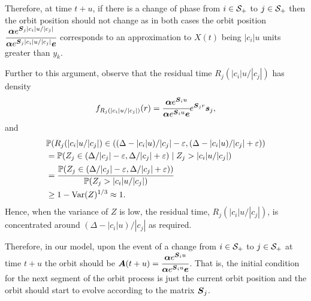 Therefore, at time \(t+u\), if there is a change of phase from \(i\in\mathcal{S}_+\) to \(j\in\mathcal{S}_+\) then the orbit position should not change as in both cases the orbit position \(\cfrac{\boldsymbol \alpha e^{\boldsymbol S_j |c_i|u/|c_j| } }{\boldsymbol \alpha e^{\boldsymbol S_j |c_i|u/|c_j|} \boldsymbol e }\) corresponds to an approximation to \(X(t)\) being \(|c_i|u\) units greater than \(y_k\). 


Further to this argument, observe that the residual time \(R_j(|c_i|u/|c_j|)\) has density 
\[f_{R_j(|c_i|u/|c_j|)}(r) = \cfrac{\boldsymbol\alpha e^{\boldsymbol S_iu } }{\boldsymbol\alpha e^{\boldsymbol S_iu } \boldsymbol e}e^{\boldsymbol S_j r}\boldsymbol s_j,\]
and 
\begin{align}
	&\mathbb P(R_j(|c_i|u/|c_j|) \in ((\Delta-|c_i|u)/|c_j|-\varepsilon, (\Delta-|c_i|u)/|c_j| + \varepsilon)) 
	\\&=\mathbb P(Z_j\in (\Delta/|c_j|-\varepsilon, \Delta/|c_j| + \varepsilon)\mid Z_j > |c_i|u/|c_j|) 
	\\&= \cfrac{\mathbb P(Z_j\in (\Delta/|c_j|-\varepsilon, \Delta/|c_j| + \varepsilon))}{\mathbb P(Z_j > |c_i|u/|c_j|)} 
	\\&\geq 1-\mathrm{Var}(Z)^{1/3} \approx 1.
\end{align}
Hence, when the variance of \(Z\) is low, the residual time, \(R_j(|c_i|u/|c_j|)\), is concentrated around \((\Delta - |c_i|u)/|c_j|\) as required. 

Therefore, in our model, upon the event of a change from \(i\in\mathcal{S}_+\) to \(j\in\mathcal{S}_+\) at time \(t+u\) the orbit should be \(\boldsymbol A(t+u) = \cfrac{\boldsymbol\alpha e^{\boldsymbol S_iu } }{\boldsymbol\alpha e^{\boldsymbol S_iu } \boldsymbol e}\). That is, the initial condition for the next segment of the orbit process is just the current orbit position and the orbit should start to evolve according to the matrix \(\boldsymbol S_j\).

